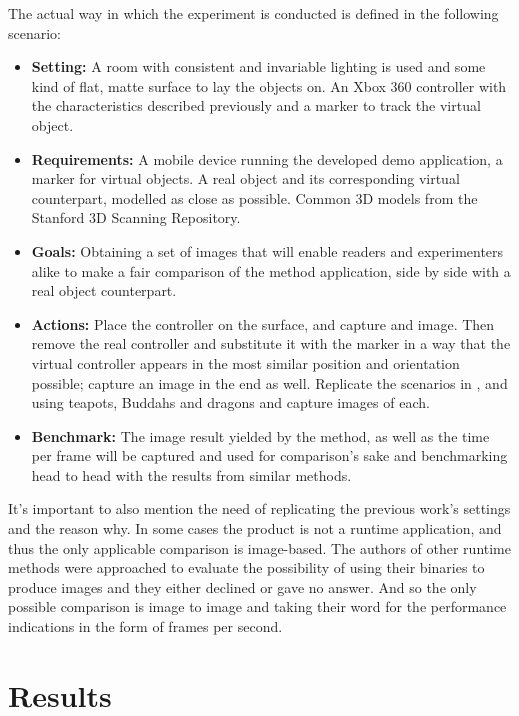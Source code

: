 The actual way in which the experiment is conducted is defined in the following scenario:
\begin{itemize}
    \item \textbf{Setting:} A room with consistent and invariable lighting is used and some kind of flat, matte surface to lay the objects on. An Xbox 360 controller with the characteristics described previously and a marker to track the virtual object.
    \item \textbf{Requirements:} A mobile device running the developed demo application, a marker for virtual objects. A real object and its corresponding virtual counterpart, modelled as close as possible. Common 3D models from the Stanford 3D Scanning Repository.
    \item \textbf{Goals:} Obtaining a set of images that will enable readers and experimenters alike to make a fair comparison of the method application, side by side with a real object counterpart.
    \item \textbf{Actions:} Place the controller on the surface, and capture and image. Then remove the real controller and substitute it with the marker in a way that the virtual controller appears in the most similar position and orientation possible; capture an image in the end as well. Replicate the scenarios in \cite{kanbara2004}, \cite{karsh2014} and \cite{pessoa2011} using teapots, Buddahs and dragons and capture images of each.
     \item \textbf{Benchmark:} The image result yielded by the method, as well as the time per frame will be captured and used for comparison's sake and benchmarking head to head with the results from similar methods.
\end{itemize}

It's important to also mention the need of replicating the previous work's settings and the reason why. In some cases the product is not a runtime application, and thus the only applicable comparison is image-based. The authors of other runtime methods were approached to evaluate the possibility of using their binaries to produce images and they either declined or gave no answer. And so the only possible comparison is image to image and taking their word for the performance indications in the form of frames per second.\newline

\section{Results}

